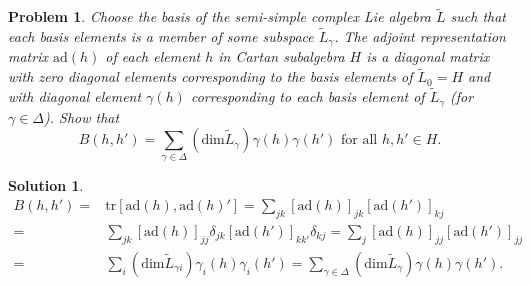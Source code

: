 \documentclass[UTF8,10pt,a4paper]{article}
\theoremstyle{Problem}
\newtheorem{prob}{Problem}
\theoremstyle{Solution}
\newtheorem*{sol}{Solution}
\begin{document}
\begin{prob}
    Choose the basis of the semi-simple complex Lie algebra $\tilde{L}$ such that each basis elements is a member of some subspace $\tilde{L}_{\gamma}$. The adjoint representation matrix $\text{ad}(h)$ of each element $h$ in Cartan subalgebra $H$ is a diagonal matrix with zero diagonal elements corresponding to the basis elements of $\tilde{L}_0=H$ and with diagonal element $\gamma(h)$ corresponding to each basis element of $\tilde{L}_{\gamma}$ (for $\gamma\in\Delta$). Show that
    \[
        B(h,h')=\sum_{\gamma\in\Delta}(\text{dim}\tilde{L}_{\gamma})\gamma(h)\gamma(h')\text{ for all }h,h'\in H.
    \]
\end{prob}
\begin{sol}
    \begin{align}
        \nonumber B(h,h')=&\text{tr}[\text{ad}(h),\text{ad}(h)']=\sum_{jk}[\text{ad}(h)]_{jk}[\text{ad}(h')]_{kj}\\
        \nonumber=&\sum_{jk}[\text{ad}(h)]_{jj}\delta_{jk}[\text{ad}(h')]_{kk'}\delta_{kj}=\sum_j[\text{ad}(h)]_{jj}[\text{ad}(h')]_{jj}\\
        =&\sum_i(\text{dim}\tilde{L}_{\gamma i})\gamma_i(h)\gamma_i(h')=\sum_{\gamma\in\Delta}(\text{dim}\tilde{L}_{\gamma})\gamma(h)\gamma(h').
    \end{align}
\end{sol}
\end{document}
